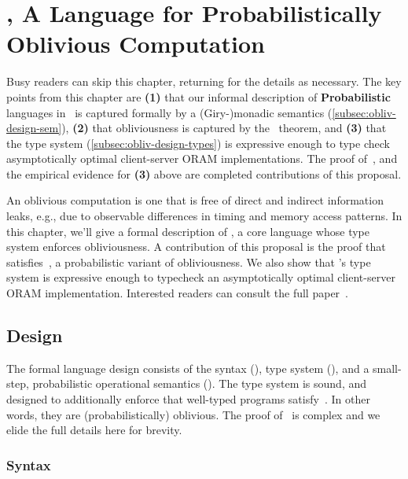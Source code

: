 \chapter{\obliv, A Language for Probabilistically Oblivious Computation}
\label{ch:obliv}

Busy readers can skip this chapter, returning for the details as necessary. The key points from this chapter are \textbf{(1)}
that our informal description of \textbf{Probabilistic} languages in~ is captured formally by a (Giry-)monadic semantics
(\ref{subsec:obliv-design-sem}), \textbf{(2)} that obliviousness is captured by the~ theorem, and \textbf{(3)} that
the type system (\ref{subsec:obliv-design-types}) is expressive enough to type check asymptotically optimal client-server ORAM implementations.
The proof of~, and the empirical evidence for \textbf{(3)} above are completed contributions of this proposal.

An oblivious computation is one that is free of direct and indirect information leaks, e.g., due to observable differences
in timing and memory access patterns. In this chapter, we'll give a formal description of \obliv, a core language whose
type system enforces obliviousness. A contribution of this proposal is the proof that \obliv satisfies~,
a probabilistic variant of obliviousness. We also show that \obliv's type system is expressive enough to typecheck an asymptotically
optimal client-server ORAM implementation. Interested readers can consult the full paper~\cite{darais20obliv}.

\section{Design}
\label{sec:obliv-design}

The formal language design consists of the syntax (), type system (),
and a small-step, probabilistic operational semantics (). The type system is sound, and designed to additionally
enforce that well-typed programs satisfy~. In other words, they are (probabilistically) oblivious.
The proof of~ is complex and we elide the full details here for brevity.


\subsection{Syntax}
\label{subsec:obliv-design-syntax}

